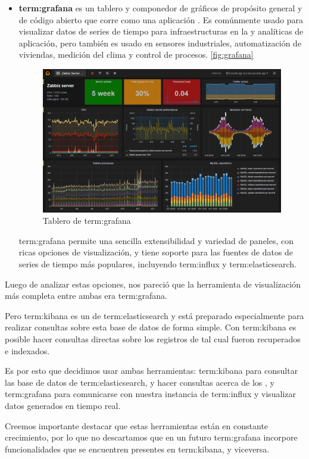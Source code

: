 \begin{itemize}
\item
\textbf{\gls{term:grafana}} es un tablero y componedor de gráficos de propósito general
y de código abierto que corre como una aplicación . Es comúnmente
usado para visualizar datos de series de tiempo para infraestructuras en la
 y analíticas de aplicación, pero también es usado en sensores
industriales, automatización de viviendas, medición del clima y control de
procesos. \autoref{fig:grafana}

\begin{figure}
  \includegraphics[width=\linewidth]{src/images/05-capitulo-5/grafana.png}
  \caption{Tablero de \gls{term:grafana}}
  \label{fig:grafana}
\end{figure}

\gls{term:grafana} permite una sencilla extensibilidad y variedad de paneles,
con ricas opciones de visualización, y tiene soporte para las fuentes de datos
de series de tiempo más populares, incluyendo \gls{term:influx} y
\gls{term:elasticsearch}.

\end{itemize}

Luego de analizar estas opciones, nos pareció que la herramienta de
visualización más completa entre ambas era \gls{term:grafana}.

Pero \gls{term:kibana} es un  de \gls{term:elasticsearch} y está preparado
especialmente para realizar consultas sobre esta base de datos de forma simple.
Con \gls{term:kibana} es posible hacer consultas directas sobre los registros
de  tal cual fueron recuperados e indexados.

Es por esto que decidimos usar ambas herramientas: \gls{term:kibana} para
consultar las base de datos de \gls{term:elasticsearch}, y hacer consultas
acerca de los , y \gls{term:grafana} para comunicarse con nuestra instancia
de \gls{term:influx} y visualizar datos generados en tiempo real.

Creemos importante destacar que estas herramientas están en constante
crecimiento, por lo que no descartamos que en un futuro \gls{term:grafana}
incorpore funcionalidades que se encuentren presentes en \gls{term:kibana}, y
viceversa.
